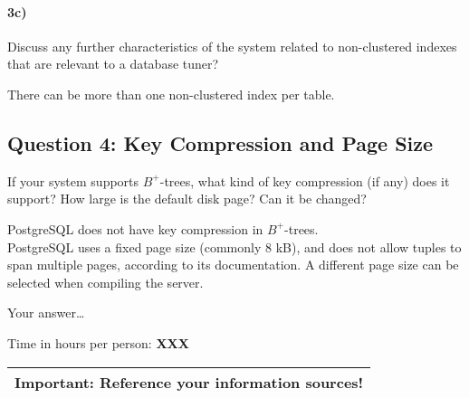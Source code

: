 \documentclass[11pt]{scrartcl}
\begin{document}
\paragraph{3c)} Discuss any further characteristics of the system related to
non-clustered indexes that are relevant to a database tuner?

There can be more than one non-clustered index per table.




\subsection*{Question 4: Key Compression and Page Size} If your system
supports $B^+$-trees, what kind of key compression (if any) does it
support?  How large is the default disk page? Can it be changed?

PostgreSQL does not have key compression in $B^+$-trees.\\
PostgreSQL uses a fixed page size (commonly 8 kB), and does not allow tuples to span multiple pages, according to its documentation.
A different page size can be selected when compiling the server.
\smallskip

Your answer\dots


\bigskip

\noindent Time in hours per person: {\bf XXX}

\bigskip

\begin{center}
  \begin{tabular}{c}
    \hline
    {\bf Important:} Reference your information sources!
    \\\hline
  \end{tabular}
\end{center}
\end{document}
